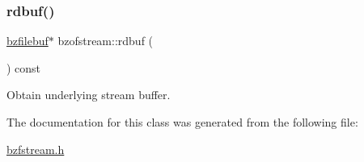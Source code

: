 \subsubsection{\texorpdfstring{rdbuf()}{rdbuf()}}
{\footnotesize\ttfamily \hyperlink{classbzfilebuf}{bzfilebuf}$\ast$ bzofstream\+::rdbuf (\begin{DoxyParamCaption}{ }\end{DoxyParamCaption}) const\hspace{0.3cm}{\ttfamily [inline]}}

Obtain underlying stream buffer. 

The documentation for this class was generated from the following file\+:\begin{DoxyCompactItemize}
\item 
\hyperlink{bzfstream_8h}{bzfstream.\+h}\end{DoxyCompactItemize}
